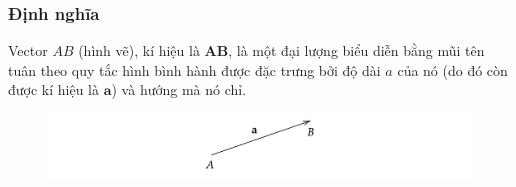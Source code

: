 \begin{frame}
\frametitle{Định nghĩa}
\begin{tcolorbox}[colback=blue!10, colframe=blue!50!black, title=Định nghĩa]
    Vector \(AB\) (hình vẽ), kí hiệu là \(\mathbf{AB}\), là một đại lượng biểu diễn bằng mũi tên tuân theo quy tắc hình bình hành được đặc trưng bởi độ dài \(a\) của nó (do đó còn được kí hiệu là \(\mathbf{a}\)) và hướng mà nó chỉ.
\end{tcolorbox}
    \begin{figure}[H]
    \centering
    \includegraphics[width=1\textwidth]{Slides/Figure/vectorAB.png}
\end{figure}
\end{frame}